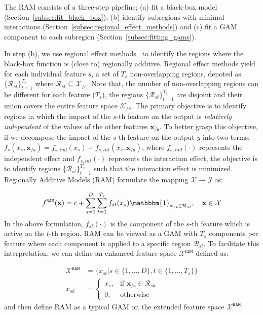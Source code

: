 \documentclass[12pt]{article}
\newcommand{\xb}{\mathbf{x}}
\newcommand{\xcc}{\mathbf{x_{/s}}}
\newcommand{\Xcal}{\mathcal{X}}
\newcommand{\when}[1]{\mathbbm{1}_{#1}}
\begin{document}
The RAM consists of a three-step pipeline; (a) fit a black-box model (Section~\ref{subsec:fit_black_box}),
(b) identify subregions with minimal interactions (Section~\ref{subsec:regional_effect_methods}) and
(c) fit a GAM component to each subregion (Section~\ref{subsec:fitting_gams}).

In step (b), we use regional effect methods~\citep{herbinger2023decomposing, herbinger2022repid}
to identify the regions where the black-box function is (close to) regionally additive.
Regional effect methods yield for each individual feature \(s\), a set of \(T_s\) non-overlapping regions,
denoted as \(\{\mathcal{R}_{st}\}_{t=1}^{T_s}\) where \(\mathcal{R}_{st} \subseteq \Xcal_{/s}\).
Note that, the number of non-overlapping regions can be different for each feature ($T_s$),
the regions \(\{\mathcal{R}_{st}\}_{t=1}^{T_s}\) are disjoint
and their union covers the entire feature space \(\Xcal_{/s}\).
The primary objective is to identify regions in which the impact of the \(s\)-th feature on the output is
\textit{relatively independent} of the values of the other features \(\xcc\).
To better grasp this objective, if we decompose the impact of the \(s\)-th feature on the output $y$ into two terms:
\(f_s(x_s, \xcc) = f_{s,ind}(x_s) + f_{s, int}(x_s, \xcc)\),
where \(f_{s,ind}(\cdot)\) represents the independent effect
and \(f_{s, int}(\cdot)\) represents the interaction effect,
the objective is to identify regions \(\{\mathcal{R}_{st}\}_{t=1}^{T_s}\) such that the interaction effect is minimized.
Regionally Additive Models (RAM) formulate the mapping \(\mathcal{X} \rightarrow \mathcal{Y}\) as:

\begin{equation}
\label{eq:ram_formulation}
f^{\mathtt{RAM}}(\xb) = c + \sum_{s=1}^D \sum_{t=1}^{T_s} f_{st}(x_s) \when{\xcc \in \mathcal{R}_{st}}, \quad \xb \in \Xcal
\end{equation}
%
In the above formulation, \(f_{st}(\cdot)\) is the component of the \(s\)-th feature which is active on the \(t\)-th region.
RAM can be viewed as a GAM with \(T_s\) components per feature where each component is applied to a specific region \(\mathcal{R}_{st}\).
To facilitate this interpretation, we can define an enhanced feature space \(\Xcal^\mathtt{RAM}\) defined as:

\begin{equation}
\label{eq:ram_feature_space}
\begin{aligned}
\Xcal^{\mathtt{RAM}} &= \{x_{st} | s \in \{1, \ldots, D\}, t \in \{1, \ldots, T_s\}\} \\
x_{sk} &= \begin{cases}
x_s, & \text{if } \xcc \in \mathcal{R}_{sk} \\
0, & \text{otherwise}
\end{cases}
\end{aligned}
\end{equation}
%
and then define RAM as a typical GAM on the extended feature space \(\Xcal^{\mathtt{RAM}}\):
\end{document}
